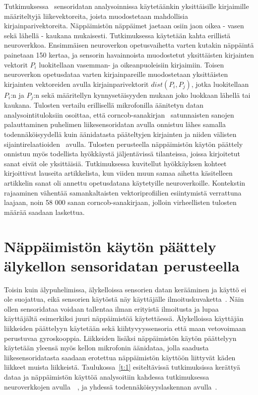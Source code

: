 \documentclass[finnish]{tktltiki2}
\theoremstyle{definition}
\theoremstyle{remark}
\begin{document}
Tutkimuksessa~\cite{mar} sensoridatan analysoinnissa käytetäänkin yksittäisille kirjaimille määriteltyjä liikevektoreita, joista muodostetaan mahdollisia kirjainparivektoreita. Näppäimistön näppäimet jaetaan osiin jaon oikea - vasen sekä lähellä - kaukana mukaisesti. Tutkimuksessa käytetään kahta erillistä neuroverkkoa. Ensimmäisen neuroverkon opetusvaihetta varten kutakin näppäintä painetaan 150 kertaa, ja sensorin havainnoista muodostetut yksittäisten kirjainten vektorit $P_i$ luokitellaan vasemman- ja oikeanpuoleisiin kirjaimiin. Toisen neuroverkon opetusdataa varten kirjainpareille muodostetaan yksittäisten kirjainten vektoreiden avulla kirjainparivektorit $dist(P_i,P_j)$, jotka luokitellaan $P_i$:n ja $P_j$:n sekä määritellyn kynnysetäisyyden mukaan joko luokkaan lähellä tai kaukana. Tulosten vertailu erillisellä mikrofonilla äänitetyn datan analysointituloksiin osoittaa, että corncob-sanakirjan~\cite{corn} satunnaisten sanojen palauttaminen puhelimen liikesensoridatan avulla onnistuu lähes samalla todennäköisyydellä kuin äänidatasta pääteltyjen kirjainten ja niiden välisten sijaintirelaatioiden~\cite{berger} avulla. Tulosten perusteella näppäimistön käytön päättely onnistuu myös todellista hyökkäystä jäljentävissä tilanteissa, joissa kirjoitetut sanat eivät ole yksittäisiä. Tutkimuksessa kuvitellut hyökkäyksen kohteet kirjoittivat lauseita artikkelista, kun viiden muun samaa aihetta käsitelleen artikkelin sanat oli annettu opetusdatana käytetyille neuroverkoille. Kontekstin rajaaminen vähentää samankaltaisten vektoriprofiilien esiintymistä verrattuna laajaan, noin 58 000 sanan corncob-sanakirjaan, jolloin virheellisten tulosten määrää saadaan laskettua.
 

\section{Näppäimistön käytön päättely älykellon sensoridatan perusteella}
Toisin kuin älypuhelimissa, älykelloissa sensorien datan kerääminen ja käyttö ei ole suojattua, eikä sensorien käytöstä näy käyttäjälle ilmoituskuvaketta~\cite{liu}. Näin ollen sensoridataa voidaan tallentaa ilman erityistä ilmoitusta ja lupaa käyttäjältä esimerkiksi juuri näppäimistöä käytettäessä.
Älykelloissa käyttäjän liikkeiden päättelyyn käytetään sekä kiihtyvyyssensoria että maan vetovoimaan perustuvaa gyroskooppia. Liikkeiden lisäksi näppäimistön käytön päättelyyn käytetään yleensä myös kellon mikrofonin äänidataa, jolla saadusta liikesensoridatasta saadaan erotettua näppäimistön käyttöön liittyvät käden liikkeet muista liikkeistä. Taulukossa~\ref{t:1} esiteltävissä tutkimuksissa kerättyä dataa ja näppäimistön käyttöä analysoitiin kahdessa tutkimuksessa neuroverkkojen avulla~\cite{maiti}~\cite{liu}, ja yhdessä todennäköisyyslaskennan avulla~\cite{mole}.
\end{document}
